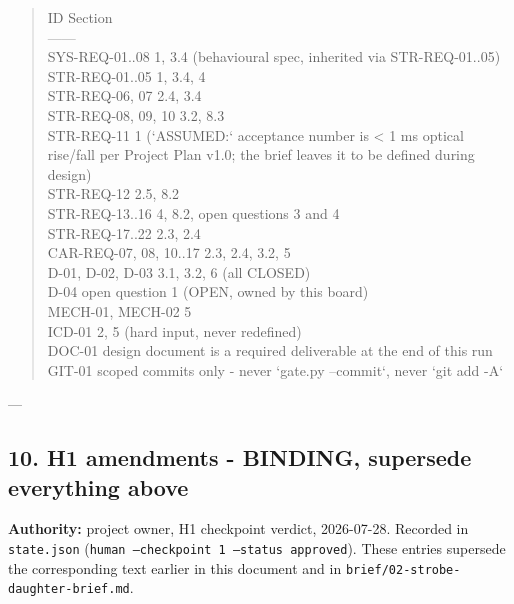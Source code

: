 \documentclass[11pt,a4paper]{article}
\begin{document}
\begin{quote}\small\ttfamily\raggedright
\textbar{} ID \textbar{} Section \textbar{}\\
\textbar{}---\textbar{}---\textbar{}\\
\textbar{} SYS-REQ-01..08 \textbar{} 1, 3.4 (behavioural spec, inherited via STR-REQ-01..05) \textbar{}\\
\textbar{} STR-REQ-01..05 \textbar{} 1, 3.4, 4 \textbar{}\\
\textbar{} STR-REQ-06, 07 \textbar{} 2.4, 3.4 \textbar{}\\
\textbar{} STR-REQ-08, 09, 10 \textbar{} 3.2, 8.3 \textbar{}\\
\textbar{} STR-REQ-11 \textbar{} 1 (`ASSUMED:` acceptance number is \textless{} 1 ms optical rise/fall per Project Plan v1.0; the brief leaves it to be defined during design) \textbar{}\\
\textbar{} STR-REQ-12 \textbar{} 2.5, 8.2 \textbar{}\\
\textbar{} STR-REQ-13..16 \textbar{} 4, 8.2, open questions 3 and 4 \textbar{}\\
\textbar{} STR-REQ-17..22 \textbar{} 2.3, 2.4 \textbar{}\\
\textbar{} CAR-REQ-07, 08, 10..17 \textbar{} 2.3, 2.4, 3.2, 5 \textbar{}\\
\textbar{} D-01, D-02, D-03 \textbar{} 3.1, 3.2, 6 (all CLOSED) \textbar{}\\
\textbar{} D-04 \textbar{} open question 1 (OPEN, owned by this board) \textbar{}\\
\textbar{} MECH-01, MECH-02 \textbar{} 5 \textbar{}\\
\textbar{} ICD-01 \textbar{} 2, 5 (hard input, never redefined) \textbar{}\\
\textbar{} DOC-01 \textbar{} design document is a required deliverable at the end of this run \textbar{}\\
\textbar{} GIT-01 \textbar{} scoped commits only - never `gate.py --commit`, never `git add -A` \textbar{}
\end{quote}
---

\subsection*{10. H1 amendments - BINDING, supersede everything above}
\textbf{Authority:} project owner, H1 checkpoint verdict, 2026-07-28. Recorded in \texttt{state.json} (\texttt{human --checkpoint 1 --status approved}). These entries supersede the corresponding text earlier in this document and in \texttt{brief/02-strobe-daughter-brief.md}.
\end{document}
